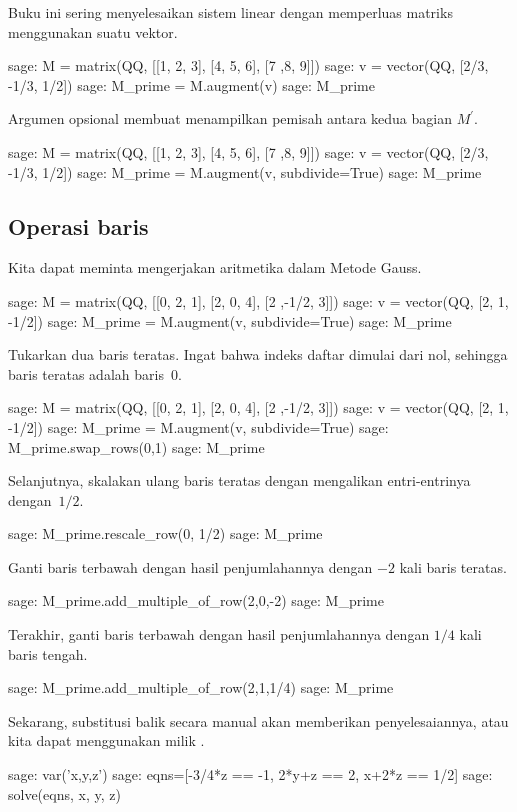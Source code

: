 Buku ini sering menyelesaikan sistem linear dengan memperluas matriks
menggunakan suatu vektor.
\begin{sagecommandline}
sage: M = matrix(QQ, [[1, 2, 3], [4, 5, 6], [7 ,8, 9]])
sage: v = vector(QQ, [2/3, -1/3, 1/2])
sage: M_prime = M.augment(v)
sage: M_prime
\end{sagecommandline}
Argumen opsional membuat
\Sage{} menampilkan pemisah antara kedua bagian
$M^\prime$.
\begin{sagecommandline}
sage: M = matrix(QQ, [[1, 2, 3], [4, 5, 6], [7 ,8, 9]])
sage: v = vector(QQ, [2/3, -1/3, 1/2])
sage: M_prime = M.augment(v, subdivide=True)
sage: M_prime                              
\end{sagecommandline}



\subsection{Operasi baris}
Kita dapat meminta \Sage{} mengerjakan aritmetika dalam Metode Gauss.
\begin{sagecommandline}
sage: M = matrix(QQ, [[0, 2, 1], [2, 0, 4], [2 ,-1/2, 3]])
sage: v = vector(QQ, [2, 1, -1/2])                        
sage: M_prime = M.augment(v, subdivide=True)              
sage: M_prime                                             
\end{sagecommandline}
Tukarkan dua baris teratas. 
Ingat bahwa indeks daftar dimulai dari nol,
sehingga baris teratas adalah baris~$0$.
\begin{sagecommandline}
sage: M = matrix(QQ, [[0, 2, 1], [2, 0, 4], [2 ,-1/2, 3]])
sage: v = vector(QQ, [2, 1, -1/2])                        
sage: M_prime = M.augment(v, subdivide=True)              
sage: M_prime.swap_rows(0,1)
sage: M_prime
\end{sagecommandline}
Selanjutnya, skalakan ulang baris teratas dengan mengalikan entri-entrinya
dengan~$1/2$.
\begin{sagecommandline}
sage: M_prime.rescale_row(0, 1/2)
sage: M_prime
\end{sagecommandline}
Ganti baris terbawah dengan
hasil penjumlahannya dengan
$-2$ kali baris teratas.
\begin{sagecommandline}
sage: M_prime.add_multiple_of_row(2,0,-2)
sage: M_prime
\end{sagecommandline}
Terakhir, ganti baris terbawah dengan hasil penjumlahannya dengan
$1/4$ kali baris tengah.
\begin{sagecommandline}
sage: M_prime.add_multiple_of_row(2,1,1/4)
sage: M_prime                             
\end{sagecommandline}
Sekarang, substitusi balik secara manual akan memberikan penyelesaiannya,
atau kita dapat menggunakan  milik \Sage{}.
\begin{sagecommandline}
sage: var('x,y,z')
sage: eqns=[-3/4*z == -1, 2*y+z == 2, x+2*z == 1/2]
sage: solve(eqns, x, y, z)
\end{sagecommandline}

